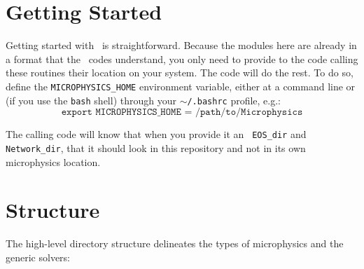 \section{Getting Started}

Getting started with \microphysics\ is straightforward. Because the
modules here are already in a format that the \boxlib\ codes
understand, you only need to provide to the code calling these
routines their location on your system. The code will do the rest. To
do so, define the {\tt MICROPHYSICS\_HOME} environment variable, either
at a command line or (if you use the {\tt bash} shell) through your
{\tt $\sim$/.bashrc} profile, e.g.:
\begin{equation*}
  \texttt{export MICROPHYSICS\_HOME = /path/to/Microphysics}
\end{equation*}

The calling code will know that when you provide it an {\tt
  EOS\_dir}  and {\tt
  Network\_dir}, that it should look in this repository and not in its
own microphysics location.


\section{Structure}

The high-level directory structure delineates the types of microphysics
and the generic solvers:

